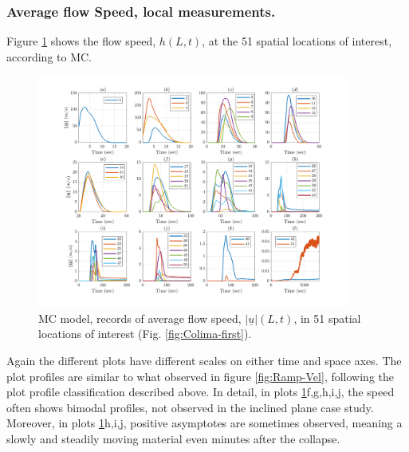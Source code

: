 \documentclass{article}
\begin{document}
\subsubsection{Average flow Speed, local measurements.}
Figure \ref{fig:BAF-V-MC} shows the flow speed, $h(L,t)$, at the 51 spatial locations of interest, according to MC.
\begin{figure}[H]
         \centering
        \includegraphics[width=0.92\textwidth]{MC&VS_51/Velocity_MC3.png}
        \caption{MC model, records of average flow speed, $\vert\underline{u}\vert(L,t)$, in 51 spatial locations of interest (Fig. \ref{fig:Colima-first}).}
        \label{fig:BAF-V-MC}
\end{figure}
Again the different plots have different scales on either time and space axes. The plot profiles are similar to what observed in figure \ref{fig:Ramp-Vel}, following the plot profile classification described above. In detail, in plots  \ref{fig:BAF-V-MC}f,g,h,i,j, the speed often shows bimodal profiles, not observed in the inclined plane case study. Moreover, in plots \ref{fig:BAF-V-MC}h,i,j, positive asymptotes are sometimes observed, meaning a slowly and steadily moving material even minutes after the collapse.
\end{document}
